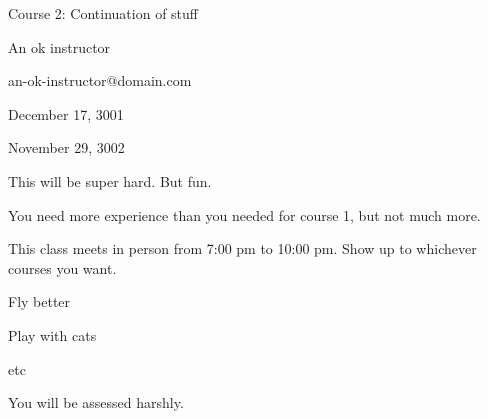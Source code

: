 
Course 2: Continuation of stuff

An ok instructor

an-ok-instructor@domain.com

December 17, 3001

November 29, 3002

This will be super hard. But fun.

You need more experience than you needed for course 1, but not much more.

This class meets in person from 7:00 pm to 10:00 pm. Show up to whichever courses you want.

\item Fly better
\item Play with cats
\item etc

You will be assessed harshly.
